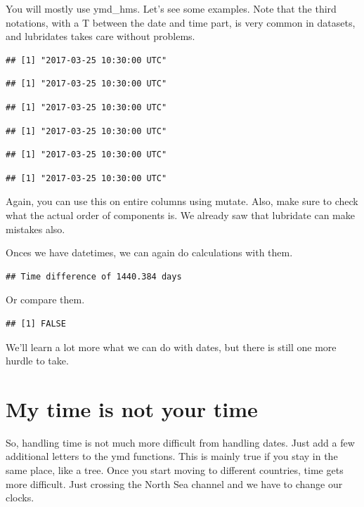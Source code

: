 \documentclass[]{tufte-book}
\begin{document}
You will mostly use ymd\_hms. Let's see some examples. Note that the third notations, with a T between the date and time part, is very common in datasets, and lubridates takes care without problems.

\begin{verbatim}
## [1] "2017-03-25 10:30:00 UTC"
\end{verbatim}

\begin{verbatim}
## [1] "2017-03-25 10:30:00 UTC"
\end{verbatim}

\begin{verbatim}
## [1] "2017-03-25 10:30:00 UTC"
\end{verbatim}

\begin{verbatim}
## [1] "2017-03-25 10:30:00 UTC"
\end{verbatim}

\begin{verbatim}
## [1] "2017-03-25 10:30:00 UTC"
\end{verbatim}

\begin{verbatim}
## [1] "2017-03-25 10:30:00 UTC"
\end{verbatim}

Again, you can use this on entire columns using mutate. Also, make sure to check what the actual order of components is. We already saw that lubridate can make mistakes also.

Onces we have datetimes, we can again do calculations with them.

\begin{verbatim}
## Time difference of 1440.384 days
\end{verbatim}

Or compare them.

\begin{verbatim}
## [1] FALSE
\end{verbatim}

We'll learn a lot more what we can do with dates, but there is still one more hurdle to take.

\hypertarget{my-time-is-not-your-time}{%
\section{My time is not your time}\label{my-time-is-not-your-time}}

So, handling time is not much more difficult from handling dates. Just add a few additional letters to the ymd functions. This is mainly true if you stay in the same place, like a tree. Once you start moving to different countries, time gets more difficult. Just crossing the North Sea channel and we have to change our clocks.
\end{document}
